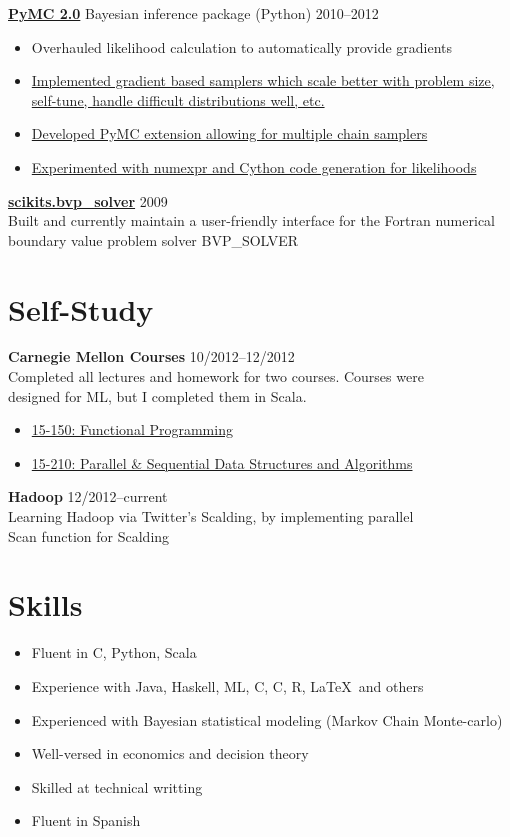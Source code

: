 \documentclass[margin]{res}
\newcommand{\bitem}{\begin{itemize} \itemsep -2pt}
\newcommand{\eitem}{\end{itemize} }
\newcommand{\hrowbase}[3]{
  {\bf #1} #2 \hfill #3
}
\newcommand{\headrow}[3]{
  \hrowbase{#1}{#2}{#3}
    \vspace{6pt}
    \bitem
      }
\newcommand{\eheadrow}[0]{\end{itemize}}
\newcommand{\headrowdesc}[3]{
  \hrowbase{#1}{}{#2} \\
    #3 
    \vspace{6pt}
      }
\newcommand{\CPP}
{C\nolinebreak[4]\hspace{-.05em}\raisebox{.22ex}{\footnotesize\bf ++}}
\newcommand{\CS}
{C\nolinebreak[4]\hspace{-.05em}\raisebox{.22ex}{\footnotesize\#}}
\begin{document}
\begin{resume}
    \headrow{\href{https://github.com/pymc-devs/pymc\#readme}{PyMC 2.0}}{Bayesian inference package (Python)}{2010--2012}
      \item Overhauled likelihood calculation to automatically provide gradients 
      \item \href{https://github.com/jsalvatier/gradient\_samplers/blob/master/gradient\_samplers}{Implemented gradient based samplers which scale better with problem size, self-tune, handle difficult distributions well, etc.}
      \item \href{http://pypi.python.org/pypi/multichain\_mcmc}{Developed PyMC extension allowing for multiple chain samplers}
      \item \href{https://github.com/pymc-devs/pymc/commits/numexpr\_dist}{Experimented with numexpr and Cython code generation for likelihoods}
    \eheadrow

    \headrowdesc{\href{packages.python.org/scikits.bvp\_solver}{scikits.bvp\_solver}}{2009}{
      Built and currently maintain a user-friendly interface for the Fortran numerical \\
    boundary value problem solver BVP\_SOLVER}

\section{Self-Study}
    \headrowdesc{Carnegie Mellon Courses}{10/2012--12/2012}{Completed all lectures and homework for two courses. Courses were \\
    designed for ML, but I completed them in Scala.} 
    \bitem
      \item \href{http://www.cs.cmu.edu/~15150/previous-semesters/2012-spring/}{15-150: Functional Programming}
      \item \href{http://www.cs.cmu.edu/~15210/index.html}{15-210: Parallel \& Sequential Data Structures and Algorithms}
    \eitem
    \headrowdesc{Hadoop}{12/2012--current}{Learning Hadoop via Twitter's Scalding, by implementing parallel \\
      Scan function for Scalding}

\section{Skills}
    \bitem
      \item Fluent in \CS, Python, Scala
      \item Experience with Java, Haskell, ML, C, \CPP, R, \LaTeX\ and others
      \item Experienced with Bayesian statistical modeling (Markov Chain Monte-carlo)
      \item Well-versed in economics and decision theory
      \item Skilled at technical writting
      \item Fluent in Spanish 
    \eitem


\end{resume}
\end{document}
